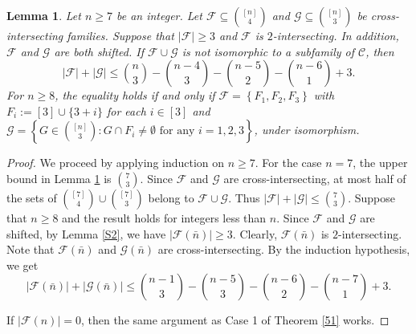 \documentclass[11pt]{article}
\numberwithin{equation}{section}
\newtheorem{lemma}[theorem]{Lemma}
\begin{document}
\begin{lemma}\label{HP51}
 Let $n \geq 7$ be an integer.  Let $\mathcal{F} \subseteq\binom{[n]}{4}$ and $\mathcal{G} \subseteq\binom{[n]}{3}$ be cross-intersecting families. Suppose that $|\mathcal{F}| \geq 3$ and $\mathcal{F}$ is $2$-intersecting.
In addition,  $\mathcal{F}$ and $\mathcal{G}$ are both shifted. If $\mathcal{F}\cup \mathcal{G}$ is not isomorphic to a subfamily of $\mathcal{C}$, then
$$
|\mathcal{F}|+|\mathcal{G}| \leq\binom{n}{3}-\binom{n-4}{3}-\binom{n-5}{2}-\binom{n-6}{1}+3.
$$
For $n \geq 8$, the equality holds if and only if $\mathcal{F}=\left\{F_1, F_2, F_3\right\}$ with $F_i:=[3]\cup \{3+i\}$ for each $i\in [3]$  and $\mathcal{G}=\left\{G \in\binom{[n]}{3}: G \cap F_i \neq\emptyset \text{ for any } i=1, 2, 3\right\}$, under isomorphism.
\end{lemma}
\begin{proof}
We proceed by applying induction on  $n\geq 7$. For the case $n=7$, the upper bound in Lemma \ref{HP51} is  $\binom{7}{3}$. Since $\mathcal{F}$ and $\mathcal{G}$ are cross-intersecting, at most half of the sets of $\binom{[7]}{4}\cup \binom{[7]}{3}$ belong to $\mathcal{F}\cup\mathcal{G}$.
Thus
$|\mathcal{F}|+|\mathcal{G}| \leq\binom{7}{3}$. 
Suppose that $n \geq 8$ and the result holds for integers less than $n$. Since $\mathcal{F}$ and $\mathcal{G}$ are shifted, by Lemma \ref{S2}, we have $|\mathcal{F}(\bar{n})| \geq 3$. Clearly, $\mathcal{F}(\bar{n})$ is $2$-intersecting. Note that $\mathcal{F}(\bar{n})$ and
$\mathcal{G}(\bar{n})$ are cross-intersecting. By the  induction hypothesis, we get
$$
|\mathcal{F}(\bar{n})|+|\mathcal{G}(\bar{n})| \leq\binom{n-1}{3}-\binom{n-5}{3}-\binom{n-6}{2}-\binom{n-7}{1}+3.
$$

If $|\mathcal{F}(n)|=0$, then the same argument as Case 1 of Theorem \ref{51} works.


\end{proof}
\end{document}
